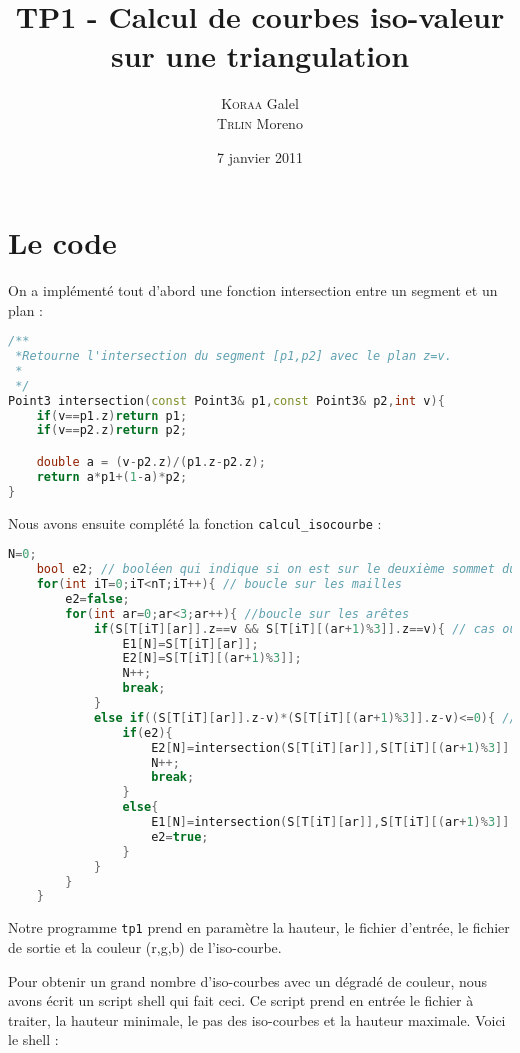 \documentclass[11pt,a4paper]{article}
\title{
  \huge{\bf TP1 - Calcul de courbes iso-valeur sur une triangulation}
}
\author{
    \textsc{Koraa} Galel \\
    \textsc{Trlin} Moreno
}
\date{7 janvier 2011}
\begin{document}
 \maketitle
 \pagebreak

  \section{Le code}
  On a implémenté tout d'abord une fonction intersection entre un segment et un plan :\\

  \begin{lstlisting}[language=c++]
/**
 *Retourne l'intersection du segment [p1,p2] avec le plan z=v.
 *
 */
Point3 intersection(const Point3& p1,const Point3& p2,int v){
	if(v==p1.z)return p1;
	if(v==p2.z)return p2;

	double a = (v-p2.z)/(p1.z-p2.z);
	return a*p1+(1-a)*p2;
}
  \end{lstlisting}

  Nous avons ensuite complété la fonction {\tt calcul\_isocourbe} :\\

  \begin{lstlisting}[language=c++]
	N=0;
	bool e2; // booléen qui indique si on est sur le deuxième sommet du segment (E2[N])
	for(int iT=0;iT<nT;iT++){ // boucle sur les mailles
		e2=false;
		for(int ar=0;ar<3;ar++){ //boucle sur les arêtes
			if(S[T[iT][ar]].z==v && S[T[iT][(ar+1)%3]].z==v){ // cas où l'arête est sur le plan
				E1[N]=S[T[iT][ar]];
				E2[N]=S[T[iT][(ar+1)%3]];
				N++;
				break;
			}
			else if((S[T[iT][ar]].z-v)*(S[T[iT][(ar+1)%3]].z-v)<=0){ // cas où le plan intersecte l'arête en un seul point
				if(e2){
					E2[N]=intersection(S[T[iT][ar]],S[T[iT][(ar+1)%3]],v);
					N++;
					break;
				}
				else{
					E1[N]=intersection(S[T[iT][ar]],S[T[iT][(ar+1)%3]],v);
					e2=true;
				}
			}
		}
	}
  \end{lstlisting}

  Notre programme {\tt tp1} prend en paramètre la hauteur,
  le fichier d'entrée, le fichier de sortie et la couleur (r,g,b) de
  l'iso-courbe.

  Pour obtenir un grand nombre d'iso-courbes avec un dégradé de couleur,
  nous avons écrit un script shell qui fait ceci. Ce script prend
  en entrée le fichier à traiter, la hauteur minimale, le pas des
  iso-courbes et la hauteur maximale.
  Voici le shell :\\
\end{document}
